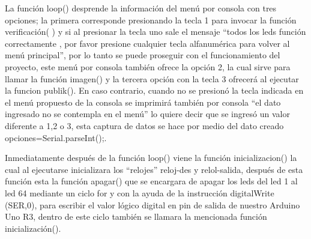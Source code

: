 \documentclass{article}
\begin{document}
La función loop() desprende  la información del menú por consola con tres opciones; la primera corresponde presionando la tecla 1 para invocar la función verificación( ) y si al presionar la tecla uno sale el mensaje “todos los leds función correctamente , por favor presione cualquier tecla alfanumérica para volver al menú principal”, por lo tanto se puede proseguir con el funcionamiento del proyecto, este menú por consola también ofrece la opción 2, la cual sirve para llamar la función imagen() y la tercera opción con la tecla 3 ofrecerá al ejecutar  la funcion publik(). En caso contrario, cuando no se presionó la tecla indicada en el menú propuesto de la consola se imprimirá también por consola “el dato ingresado no se contempla en el menú” lo quiere decir que se ingresó un valor diferente a 1,2 o 3, esta captura de datos se hace por medio del dato creado opciones=Serial.parseInt();.

Inmediatamente después de la función loop() viene la función inicializacion() la cual al ejecutarse inicializara los “relojes” reloj-des y relol-salida, después de esta función esta la función apagar() que se encargara de apagar los leds del led 1 al led 64 mediante un ciclo for y con la ayuda de la instrucción digitalWrite (SER,0), para escribir el valor lógico digital en pin de salida de nuestro Arduino Uno R3, dentro de este ciclo también se llamara la mencionada función inicialización().
\end{document}
